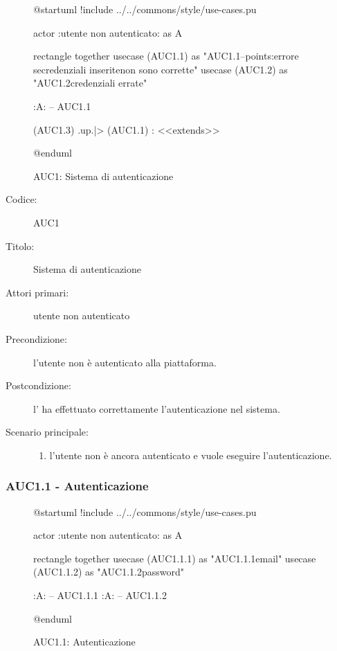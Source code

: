 \documentclass[../../../analisi-dei-requisiti.tex]{subfiles}
\begin{document}
\begin{figure}[h!]
  \centering
  \begin{plantuml}
  @startuml
  !include ../../commons/style/use-cases.pu

  actor :utente non autenticato: as A

  rectangle {
    together {
      usecase (AUC1.1) as "AUC1.1\nAutenticazione\n--\nExtension points:\nVisualizzazione errore se\nle credenziali inserite\n non sono corrette"
      usecase (AUC1.2) as "AUC1.2\nVisualizzazione credenziali errate"
    }
  }

  :A: -- AUC1.1

  (AUC1.3) .up.|> (AUC1.1) : <<extends>>

  @enduml
  \end{plantuml}
  \caption{AUC1: Sistema di autenticazione}
  \label{fig:auc1}
\end{figure}

\begin{description}
  \item[Codice:] AUC1
  \item[Titolo:] Sistema di autenticazione
  \item[Attori primari:] utente non autenticato
  \item[Precondizione:] l'utente non è autenticato alla piattaforma.
  \item[Postcondizione:] l' ha effettuato correttamente l'autenticazione nel sistema.
  \item[Scenario principale:]
  \begin{enumerate}
    \item l'utente non è ancora autenticato e vuole eseguire l'autenticazione.
  \end{enumerate}
\end{description}

\subsubsection{AUC1.1 - Autenticazione}%
\label{subs:AUC1.1}

\begin{figure}[h!]
  \centering
  \begin{plantuml}
  @startuml
  !include ../../commons/style/use-cases.pu

  actor :utente non autenticato: as A

  rectangle {
    together {
    usecase (AUC1.1.1) as "AUC1.1.1\nInserimento email"
    usecase (AUC1.1.2) as "AUC1.1.2\nInserimento password"
    }
  }

  :A: -- AUC1.1.1
  :A: -- AUC1.1.2

  @enduml
  \end{plantuml}
  \caption{AUC1.1: Autenticazione}
  \label{fig:auc1_1}
\end{figure}
\end{document}
